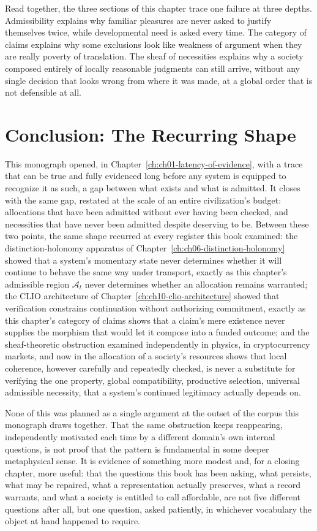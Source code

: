 Read together, the three sections of this chapter trace one failure at three depths. Admissibility explains why familiar pleasures are never asked to justify themselves twice, while developmental need is asked every time. The category of claims explains why some exclusions look like weakness of argument when they are really poverty of translation. The sheaf of necessities explains why a society composed entirely of locally reasonable judgments can still arrive, without any single decision that looks wrong from where it was made, at a global order that is not defensible at all.

\section{Conclusion: The Recurring Shape}

This monograph opened, in Chapter~\ref{ch:ch01-latency-of-evidence}, with a trace that can be true and fully evidenced long before any system is equipped to recognize it as such, a gap between what exists and what is admitted. It closes with the same gap, restated at the scale of an entire civilization's budget: allocations that have been admitted without ever having been checked, and necessities that have never been admitted despite deserving to be. Between these two points, the same shape recurred at every register this book examined: the distinction-holonomy apparatus of Chapter~\ref{ch:ch06-distinction-holonomy} showed that a system's momentary state never determines whether it will continue to behave the same way under transport, exactly as this chapter's admissible region $\mathcal{A}_t$ never determines whether an allocation remains warranted; the CLIO architecture of Chapter~\ref{ch:ch10-clio-architecture} showed that verification constrains continuation without authorizing commitment, exactly as this chapter's category of claims shows that a claim's mere existence never supplies the morphism that would let it compose into a funded outcome; and the sheaf-theoretic obstruction examined independently in physics, in cryptocurrency markets, and now in the allocation of a society's resources shows that local coherence, however carefully and repeatedly checked, is never a substitute for verifying the one property, global compatibility, productive selection, universal admissible necessity, that a system's continued legitimacy actually depends on.

None of this was planned as a single argument at the outset of the corpus this monograph draws together. That the same obstruction keeps reappearing, independently motivated each time by a different domain's own internal questions, is not proof that the pattern is fundamental in some deeper metaphysical sense. It is evidence of something more modest and, for a closing chapter, more useful: that the questions this book has been asking, what persists, what may be repaired, what a representation actually preserves, what a record warrants, and what a society is entitled to call affordable, are not five different questions after all, but one question, asked patiently, in whichever vocabulary the object at hand happened to require.
